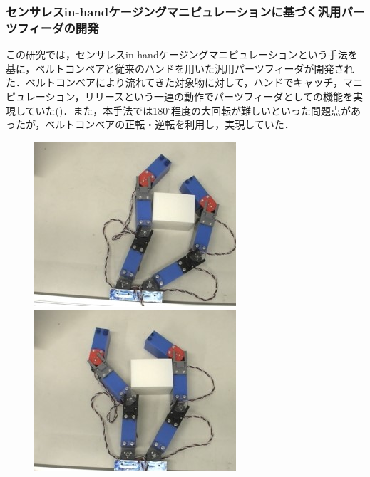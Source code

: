 \documentclass[a4paper,twoside,12pt,papersize, dvipdfmx]{iirthesis}
\begin{document}
\subsubsection{センサレスin-handケージングマニピュレーションに基づく汎用パーツフィーダの開発 \cite{kamikukita2022}}
この研究では，センサレスin-handケージングマニピュレーションという手法を基に，ベルトコンベアと従来のハンドを用いた汎用パーツフィーダが開発された．ベルトコンベアにより流れてきた対象物に対して，ハンドでキャッチ，マニピュレーション，リリースという一連の動作でパーツフィーダとしての機能を実現していた()．また，本手法では180$^\circ$程度の大回転が難しいといった問題点があったが，ベルトコンベアの正転・逆転を利用し，実現していた．
\begin{figure}[b]
\begin{minipage}{0.24\hsize}
\centering
\includegraphics[width=\hsize]{fig/1-introduction/mani1.jpg}
\subcaption{}
\end{minipage}\hfill
\begin{minipage}{0.24\hsize}
\centering
\includegraphics[width=\hsize]{fig/1-introduction/mani2.jpg}

\end{minipage}
\end{figure}
\end{document}
